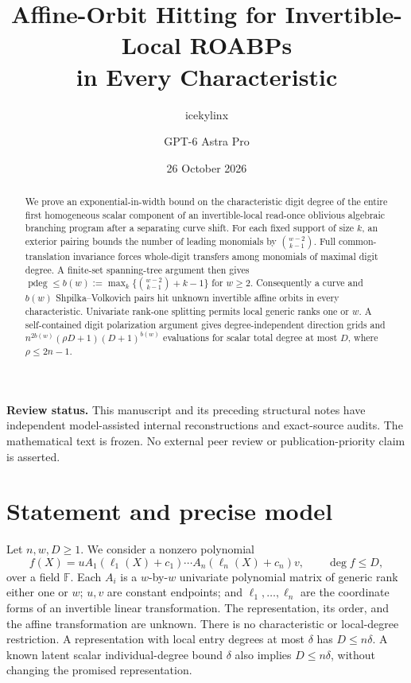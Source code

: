 \documentclass[11pt]{article}
\title{Affine-Orbit Hitting for Invertible-Local ROABPs\\
in Every Characteristic}
\author{icekylinx \and GPT-6 Astra Pro}\date{26 October 2026}
\newcommand{\F}{\mathbb F}
\newcommand{\pdeg}{\operatorname{pdeg}}
\begin{document}
\maketitle

\begin{abstract}
We prove an exponential-in-width bound on the characteristic digit degree
of the entire first homogeneous scalar component of an invertible-local
read-once oblivious algebraic branching program after a separating curve
shift. For each fixed support of size $k$, an exterior pairing bounds the
number of leading monomials by $\binom{w-2}{k-1}$. Full common-translation
invariance forces whole-digit transfers among monomials of maximal digit
degree. A finite-set spanning-tree argument then gives
$\pdeg\le b(w):=\max_k\{\binom{w-2}{k-1}+k-1\}$ for $w\ge2$.
Consequently a curve and $b(w)$ Shpilka--Volkovich pairs hit unknown
invertible affine orbits in every characteristic. Univariate rank-one
splitting permits local generic ranks one or $w$. A self-contained digit
polarization argument gives degree-independent direction grids and
$n^{2b(w)}(\rho D+1)(D+1)^{b(w)}$ evaluations for scalar total degree
at most $D$, where $\rho\le2n-1$.
\end{abstract}

\noindent\textbf{Review status.}
This manuscript and its preceding structural notes have independent
model-assisted internal reconstructions and exact-source audits.
The mathematical text is frozen. No external peer review
or publication-priority claim is asserted.

\section{Statement and precise model}

Let $n,w,D\ge1$. We consider a nonzero polynomial
\begin{equation}\label{eq:model}
 f(X)=uA_1(\ell_1(X)+c_1)\cdots A_n(\ell_n(X)+c_n)v,
 \qquad \deg f\le D,
\end{equation}
over a field $\F$. Each $A_i$ is a $w$-by-$w$ univariate polynomial
matrix of generic rank either one or $w$; $u,v$ are constant endpoints;
and $\ell_1,\ldots,\ell_n$ are the coordinate forms of an invertible
linear transformation. The representation, its order, and the affine
transformation are unknown. There is no characteristic or local-degree
restriction. A representation with local entry degrees at most $\delta$
has $D\le n\delta$. A known latent scalar individual-degree bound
$\delta$ also implies $D\le n\delta$, without changing the promised
representation.
\end{document}
